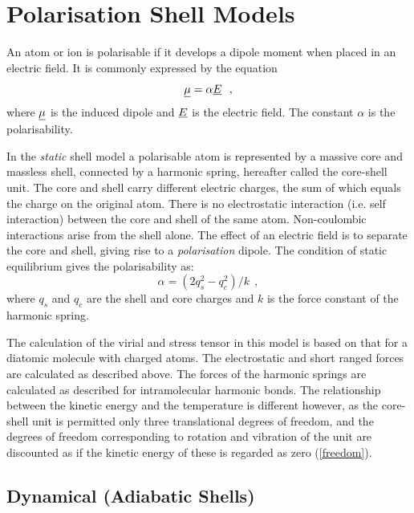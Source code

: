 \section{Polarisation Shell Models}

An atom or ion is polarisable if it develops a
dipole moment when placed in an electric field.  It is commonly
expressed by the equation
\begin{equation}
\mbox{$\underline{\mu}$} = \alpha \mbox{$\underline{E}$}~~,
\end{equation}
where $\mbox{$\underline{\mu}$}$ is the induced dipole and $\mbox{$\underline{E}$}$ is the
electric field.  The constant $\alpha$ is the polarisability.

In the {\em static} shell model a
polarisable atom is represented by
a massive core and massless shell, connected by a harmonic spring,
hereafter called the core-shell unit.  The core and shell carry
different electric charges, the sum of which equals the charge on
the original atom.  There is no electrostatic interaction (i.e.
self interaction) between the core and shell of the same atom.
Non-coulombic interactions arise from the shell alone.  The effect
of an electric field is to separate the core and shell, giving
rise to a {\em polarisation} dipole.  The condition of static
equilibrium gives the polarisability as:
\begin{equation}
\alpha = (2q_{s}^{2}-q_{c}^{2})/k~~,
\end{equation}
where $q_{s}$ and $q_{c}$ are the shell and core charges and $k$ is
the force constant of the harmonic spring.

The calculation of the virial and stress tensor in this model is based on that for a diatomic molecule
with charged atoms.  The electrostatic and short ranged forces are
calculated as described above.  The forces of the harmonic springs
are calculated as described for intramolecular harmonic bonds.
The relationship between the kinetic energy and the temperature is
different however, as the core-shell unit is permitted only three
translational degrees of freedom, and the degrees of freedom
corresponding to rotation and vibration of the unit are discounted
as if the kinetic energy of these is regarded as zero (\ref{freedom}).

\subsection{Dynamical (Adiabatic Shells)}
\label{shell-model}

